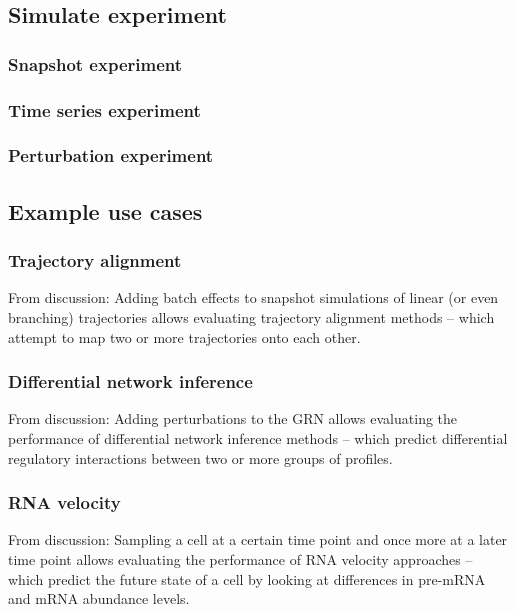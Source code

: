 \subsection{Simulate experiment}
\blindtext

\subsubsection{Snapshot experiment}
\blindtext

\subsubsection{Time series experiment}
\blindtext

\subsubsection{Perturbation experiment}
\blindtext

\subsection{Example use cases}
\subsubsection{Trajectory alignment}
From discussion: Adding batch effects to snapshot simulations of linear (or even branching) trajectories allows evaluating trajectory alignment methods -- which attempt to map two or more trajectories onto each other. 
\subsubsection{Differential network inference}
From discussion: Adding perturbations to the GRN allows evaluating the performance of differential network inference methods -- which predict differential regulatory interactions between two or more groups of profiles.
\subsubsection{RNA velocity}
From discussion: Sampling a cell at a certain time point and once more at a later time point allows evaluating the performance of RNA velocity approaches -- which predict the future state of a cell by looking at differences in pre-mRNA and mRNA abundance levels.







